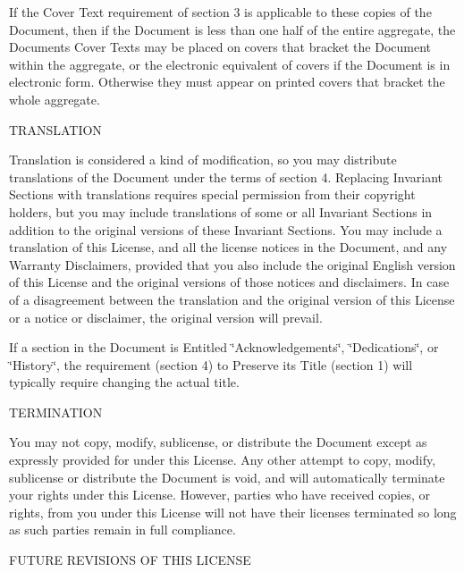 If the Cover Text requirement of section 3 is applicable to these copies of the Document, then if the Document is less than one half of the entire aggregate, the Document\textquotesingle{}s Cover Texts may be placed on covers that bracket the Document within the aggregate, or the electronic equivalent of covers if the Document is in electronic form. Otherwise they must appear on printed covers that bracket the whole aggregate.


\begin{DoxyEnumerate}
\item T\+R\+A\+N\+S\+L\+A\+T\+I\+ON
\end{DoxyEnumerate}

Translation is considered a kind of modification, so you may distribute translations of the Document under the terms of section 4. Replacing Invariant Sections with translations requires special permission from their copyright holders, but you may include translations of some or all Invariant Sections in addition to the original versions of these Invariant Sections. You may include a translation of this License, and all the license notices in the Document, and any Warranty Disclaimers, provided that you also include the original English version of this License and the original versions of those notices and disclaimers. In case of a disagreement between the translation and the original version of this License or a notice or disclaimer, the original version will prevail.

If a section in the Document is Entitled \char`\"{}\+Acknowledgements\char`\"{}, \char`\"{}\+Dedications\char`\"{}, or \char`\"{}\+History\char`\"{}, the requirement (section 4) to Preserve its Title (section 1) will typically require changing the actual title.


\begin{DoxyEnumerate}
\item T\+E\+R\+M\+I\+N\+A\+T\+I\+ON
\end{DoxyEnumerate}

You may not copy, modify, sublicense, or distribute the Document except as expressly provided for under this License. Any other attempt to copy, modify, sublicense or distribute the Document is void, and will automatically terminate your rights under this License. However, parties who have received copies, or rights, from you under this License will not have their licenses terminated so long as such parties remain in full compliance.


\begin{DoxyEnumerate}
\item F\+U\+T\+U\+RE R\+E\+V\+I\+S\+I\+O\+NS OF T\+H\+IS L\+I\+C\+E\+N\+SE
\end{DoxyEnumerate}

